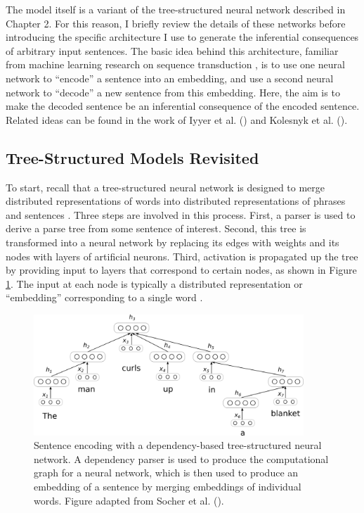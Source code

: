 The model itself is a variant of the tree-structured neural network described in Chapter 2. For this reason, I briefly review the details of these networks before introducing the specific architecture I use to generate the inferential consequences of arbitrary input sentences. The basic idea behind this architecture, familiar from machine learning research on sequence transduction \citep{Sutskever:2014}, is to use one neural network to ``encode'' a sentence into an embedding, and use a second neural network to ``decode'' a new sentence from this embedding. Here, the aim is to make the decoded sentence be an inferential consequence of the encoded sentence. Related ideas can be found in the work of Iyyer et al. (\citeyear{Iyyer:2014}) and Kolesnyk et al. (\citeyear{Kolesnyk:2016}).

\subsection{Tree-Structured Models Revisited}

To start, recall that a tree-structured neural network is designed to merge distributed representations of words into distributed representations of phrases and sentences \citep{Socher:2012,Socher:2014}. Three steps are involved in this process. First, a parser is used to derive a parse tree from some sentence of interest. Second, this tree is transformed into a neural network by replacing its edges with weights and its nodes with layers of artificial neurons. Third, activation is propagated up the tree by providing input to layers that correspond to certain nodes, as shown in Figure \ref{depnet}. The input at each node is typically a distributed representation or ``embedding'' corresponding to a single word \citep{Mikolov:2013,TurneyPantel:2010,Sahlgren:2008}.

\begin{figure}[t]
\begin{center}
\includegraphics[width=4in]{figures/depnet.png}
\end{center}
\caption{Sentence encoding with a dependency-based tree-structured neural network. A dependency parser is used to produce the computational graph for a neural network, which is then used to produce an embedding of a sentence by merging embeddings of individual words. Figure adapted from Socher et al. (\citeyear{Socher:2014}).} 
\label{depnet}
\end{figure}

